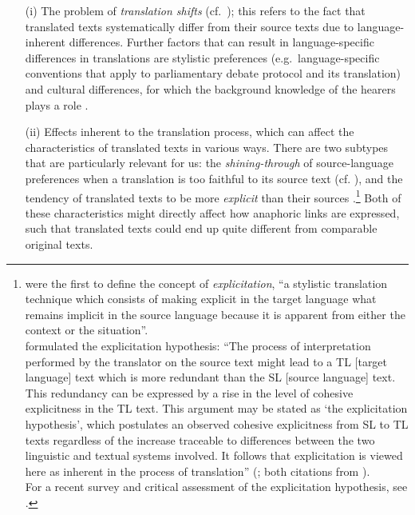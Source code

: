 \documentclass[output=paper]{LSP/langsci}
\begin{document}
\begin{itemize}
\item[(i)] The problem of \textit{translation shifts} (cf.~\citealt{vinay_darbelnet1995,Dorr1994}); this refers to the fact that translated texts systematically differ from their source texts due to language-inherent differences. Further factors that can result in language-specific differences in translations are stylistic preferences (e.g.\ language-specific conventions that apply to parliamentary debate protocol and its translation) and cultural differences, for which the background knowledge of the hearers plays a role \citep{klaudy08}.

\item[(ii)] Effects inherent to the translation process, which can affect the characteristics of translated texts in various ways. There are two subtypes that are particularly relevant for us:  the \textit{shining-through} of source-language preferences when a  translation is too faithful to its source text (cf. \citealt{Teich2003}), and the tendency of translated texts to be more \textit{explicit} than their sources \citep{vinay_darbelnet1995,blum-kulka86}.\footnote{%
\citet[342]{vinay_darbelnet1995} were the first to define the concept of \emph{explicitation}, ``a stylistic translation technique which consists of making explicit in the target language what remains implicit in the source language because it is apparent from either the context or the situation''. \\
\cite{blum-kulka86} formulated the explicitation hypothesis: ``The process of interpretation performed by the translator on the source text might lead to a TL [target language] text which is more redundant than the SL [source language] text. This redundancy can be expressed by a rise in the level of cohesive explicitness in the TL text. This argument may be stated as `the explicitation hypothesis', which postulates an observed cohesive explicitness from SL to TL texts regardless of the increase traceable to differences between the two linguistic and textual systems involved. It follows that explicitation is viewed here as inherent in the process of translation'' (\citet[19]{blum-kulka86}; both citations from \citealt{klaudy08}). \\
For a recent survey and critical assessment of the explicitation hypothesis, see \citet[Ch.~2]{becher11}.} %
Both of these characteristics might directly affect how anaphoric links are expressed, such that translated texts could end up quite different from comparable original texts. %
\end{itemize}
\end{document}
